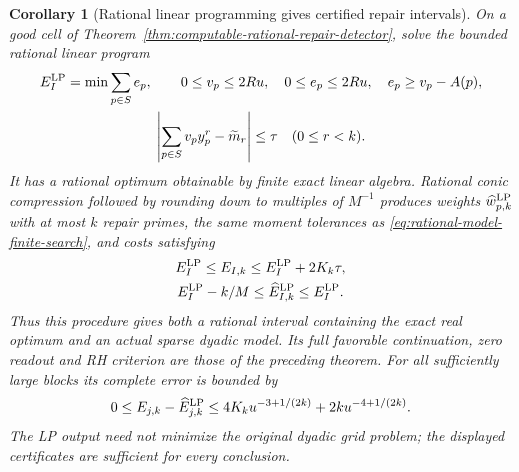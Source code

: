\documentclass[11pt]{article}
\newtheorem{corollary}[theorem]{Corollary}
\theoremstyle{definition}
\begin{document}
\begin{corollary}[Rational linear programming gives certified repair intervals]
\label{cor:rational-LP-prime-repairs}
On a good cell of Theorem~\ref{thm:computable-rational-repair-detector},
solve the bounded rational linear program
\begin{equation}
 \begin{gathered}
 E_I^{\rm LP}=\min\sum_{p\in S}e_p,\qquad
 0\le v_p\le2Ru,\quad0\le e_p\le2Ru,\quad e_p\ge v_p-A(p),\\
 \left|\sum_{p\in S}v_p y_p^r-\widetilde m_r\right|
                                      \le\tau\quad(0\le r<k).
 \end{gathered}
 \label{eq:rational-repair-linear-program}
\end{equation}
It has a rational optimum obtainable by finite exact linear
algebra. Rational conic compression followed by rounding down
to multiples of $M^{-1}$ produces weights
$\widehat w_{p,k}^{\rm LP}$ with at most $k$ repair primes,
the same moment tolerances as
\eqref{eq:rational-model-finite-search}, and costs satisfying
\begin{equation}
 \begin{gathered}
 E_I^{\rm LP}\le E_{I,k}\le E_I^{\rm LP}+2K_k\tau,\\
 E_I^{\rm LP}-k/M\le\widehat E_{I,k}^{\rm LP}
                                      \le E_I^{\rm LP}.
 \end{gathered}
 \label{eq:rational-LP-repair-certificates}
\end{equation}
Thus this procedure gives both a rational interval containing
the exact real optimum and an actual sparse dyadic model.
Its full favorable continuation, zero readout and RH criterion
are those of the preceding theorem. For all sufficiently large
blocks its complete error is bounded by
\begin{equation}
 0\le E_{j,k}-\widehat E_{j,k}^{\rm LP}
       \le4K_k u^{-3+1/(2k)}+2k u^{-4+1/(2k)}.
 \label{eq:rational-LP-total-repair-error}
\end{equation}
The LP output need not minimize the original dyadic grid problem;
the displayed certificates are sufficient for every conclusion.
\end{corollary}
\end{document}
